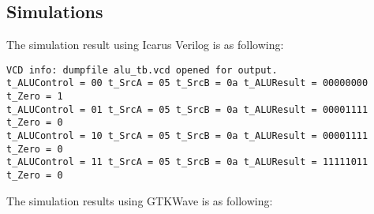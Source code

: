 \documentclass{article}
\begin{document}
\subsection*{Simulations}
The simulation result using Icarus Verilog is as following:
\begin{Verbatim}
VCD info: dumpfile alu_tb.vcd opened for output.
t_ALUControl = 00 t_SrcA = 05 t_SrcB = 0a t_ALUResult = 00000000 t_Zero = 1
t_ALUControl = 01 t_SrcA = 05 t_SrcB = 0a t_ALUResult = 00001111 t_Zero = 0
t_ALUControl = 10 t_SrcA = 05 t_SrcB = 0a t_ALUResult = 00001111 t_Zero = 0
t_ALUControl = 11 t_SrcA = 05 t_SrcB = 0a t_ALUResult = 11111011 t_Zero = 0
\end{Verbatim}
The simulation results using GTKWave is as following:
\end{document}
